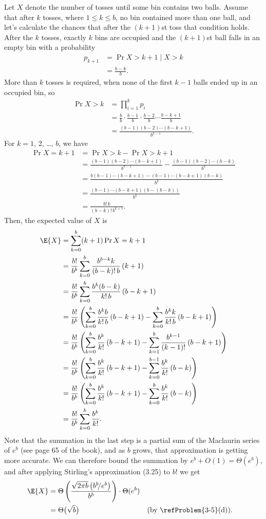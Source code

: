 Let $X$ denote the number of tosses until some bin contains two balls.
Assume that after $k$ tosses, where $1\le k\le b$, no bin contained more than one ball, and let's calculate the chances that after the $(k+1)$st toss that condition holds.
After the $k$ tosses, exactly $k$ bins are occupied and the $(k+1)$st ball falls in an empty bin with a probability
\begin{align*}
    p_{k+1} &= \Pr{X>k+1\mid X>k} \\
    &= \frac{b-k}{b}.
\end{align*}
More than $k$ tosses is required, when none of the first $k-1$ balls ended up in an occupied bin, so
\begin{align*}
    \Pr{X>k} &= \prod_{i=1}^kp_i \\
    &= \frac{b}{b}\cdot\frac{b-1}{b}\cdot\frac{b-2}{b}\cdots\frac{b-k+1}{b} \\[1mm]
    &= \frac{(b-1)(b-2)\cdots(b-k+1)}{b^{k-1}}.
\end{align*}
For $k=1$, 2, \dots, $b$, we have
\begin{align*}
    \Pr{X=k+1} &= \Pr{X>k}-\Pr{X>k+1} \\
    &= \frac{(b-1)(b-2)\cdots(b-k+1)}{b^{k-1}}-\frac{(b-1)(b-2)\cdots(b-k)}{b^k} \\[1mm]
    &= \frac{b(b-1)\cdots(b-k+1)-(b-1)\cdots(b-k+1)(b-k)}{b^k} \\[1mm]
    &= \frac{(b-1)\cdots(b-k+1)(b-(b-k))}{b^k} \\
    &= \frac{b!\,k}{(b-k)!\,b^{k+1}}.
\end{align*}
Then, the expected value of $X$ is
\begin{align*}
    \E{X} &= \sum_{k=0}^b(k+1)\Pr{X=k+1} \\
    &= \frac{b!}{b^b}\sum_{k=0}^b\frac{b^{b-k}k}{(b-k)!\,b}\,(k+1) \\
    &= \frac{b!}{b^b}\sum_{k=0}^b\frac{b^k(b-k)}{k!\,b}\,(b-k+1) \\
    &= \frac{b!}{b^b}\left(\sum_{k=0}^b\frac{b^kb}{k!\,b}\,(b-k+1)-\sum_{k=0}^b\frac{b^kk}{k!\,b}\,(b-k+1)\right) \\
    &= \frac{b!}{b^b}\left(\sum_{k=0}^b\frac{b^k}{k!}\,(b-k+1)-\sum_{k=1}^b\frac{b^{k-1}}{(k-1)!}\,(b-k+1)\right) \\
    &= \frac{b!}{b^b}\left(\sum_{k=0}^b\frac{b^k}{k!}\,(b-k+1)-\sum_{k=0}^{b-1}\frac{b^k}{k!}\,(b-k)\right) \\
    &= \frac{b!}{b^b}\left(\sum_{k=0}^b\frac{b^k}{k!}\,(b-k+1)-\sum_{k=0}^b\frac{b^k}{k!}\,(b-k)\right) \\
    &= \frac{b!}{b^b}\sum_{k=0}^b\frac{b^k}{k!}.
\end{align*}
Note that the summation in the last step is a partial sum of the Maclaurin series of $e^b$ (see page 65 of the book), and as $b$ grows, that approximation is getting more accurate.
We can therefore bound the summation by $e^b+O(1)=\Theta(e^b)$, and after applying Stirling's approximation (3.25) to $b!$ we get
\begin{align*}
    \E{X} &= \Theta\left(\frac{\sqrt{2\pi b}\,\bigl(b^b\!/e^b\bigr)}{b^b}\right)\cdot\Theta(e^b) \\
    &= \Theta\bigl(\sqrt{b}\bigr) && \text{(by \refProblem{3-5}(d))}.
\end{align*}
